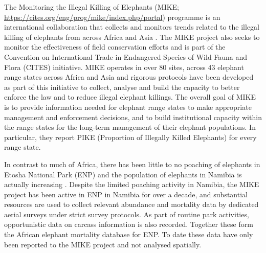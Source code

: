 \documentclass[letterpaper, 12pt]{interact}
\begin{document}
	The Monitoring the Illegal Killing of Elephants (MIKE; \url   {https://cites.org/eng/prog/mike/index.php/portal}) programme is an international collaboration that collects and monitors trends related to the illegal killing of elephants from across Africa and Asia \cite{mike2018}. The MIKE project also seeks to monitor the effectiveness of field conservation efforts and is part of the Convention on International Trade in Endangered Species of Wild Fauna and Flora (CITES) initiative. MIKE operates in over 80 sites, across 43 elephant range states across Africa and Asia and rigorous protocols have been developed as part of this initiative to collect, analyse and build the capacity to better enforce the law and to reduce illegal elephant killings. The overall goal of MIKE is to provide information needed for elephant range states to make appropriate management and enforcement decisions, and to build institutional capacity within the range states for the long-term management of their elephant populations. In particular, they report PIKE (Proportion of Illegally Killed Elephants) for every range state. 
	
	
	
	In contrast to much of Africa, there has been little to no poaching of elephants in Etosha National Park (ENP) and the population of elephants in Namibia is actually increasing \citep{Craig2020}. Despite the limited poaching activity in Namibia, the MIKE project has been active in ENP in Namibia for over a decade, and substantial resources are used to collect relevant abundance and mortality data by dedicated aerial surveys under strict survey protocols. As part of routine park activities, opportunistic data on carcass information is also recorded. Together these form the African elephant mortality database for ENP. To date these data have only been reported to the MIKE project and not analysed spatially.
	
\end{document}

